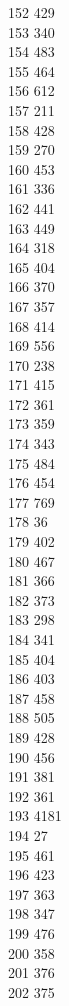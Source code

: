{ 152	429 \\
 153	340 \\
 154	483 \\
 155	464 \\
 156	612 \\
 157	211 \\
 158	428 \\
 159	270 \\
 160	453 \\
 161	336 \\
 162	441 \\
 163	449 \\
 164	318 \\
 165	404 \\
 166	370 \\
 167	357 \\
 168	414 \\
 169	556 \\
 170	238 \\
 171	415 \\
 172	361 \\
 173	359 \\
 174	343 \\
 175	484 \\
 176	454 \\
 177	769 \\
 178	36 \\
 179	402 \\
 180	467 \\
 181	366 \\
 182	373 \\
 183	298 \\
 184	341 \\
 185	404 \\
 186	403 \\
 187	458 \\
 188	505 \\
 189	428 \\
 190	456 \\
 191	381 \\
 192	361 \\
 193	4181 \\
 194	27 \\
 195	461 \\
 196	423 \\
 197	363 \\
 198	347 \\
 199	476 \\
 200	358 \\
 201	376 \\
 202	375 \\
}
